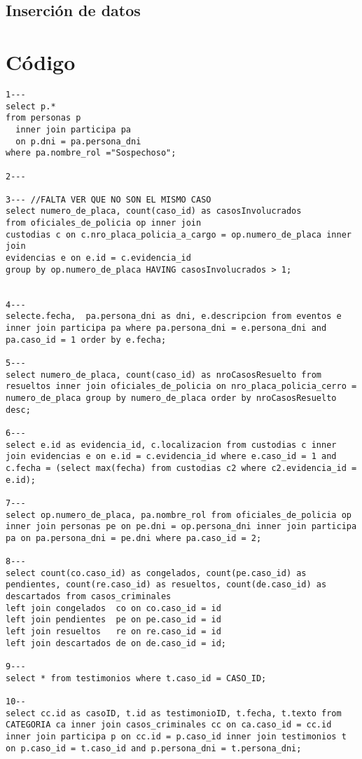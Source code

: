 \documentclass[10pt,a4paper]{article}
\begin{document}
\subsection{Inserción de datos}

\section{Código}
\begin{verbatim}
1---
select p.* 
from personas p 
  inner join participa pa 
  on p.dni = pa.persona_dni 
where pa.nombre_rol ="Sospechoso";

2---

3--- //FALTA VER QUE NO SON EL MISMO CASO
select numero_de_placa, count(caso_id) as casosInvolucrados
from oficiales_de_policia op inner join 
custodias c on c.nro_placa_policia_a_cargo = op.numero_de_placa inner join 
evidencias e on e.id = c.evidencia_id 
group by op.numero_de_placa HAVING casosInvolucrados > 1;


4---
selecte.fecha,  pa.persona_dni as dni, e.descripcion from eventos e inner join participa pa where pa.persona_dni = e.persona_dni and pa.caso_id = 1 order by e.fecha;

5---
select numero_de_placa, count(caso_id) as nroCasosResuelto from resueltos inner join oficiales_de_policia on nro_placa_policia_cerro = numero_de_placa group by numero_de_placa order by nroCasosResuelto desc;

6---
select e.id as evidencia_id, c.localizacion from custodias c inner join evidencias e on e.id = c.evidencia_id where e.caso_id = 1 and c.fecha = (select max(fecha) from custodias c2 where c2.evidencia_id = e.id);

7---
select op.numero_de_placa, pa.nombre_rol from oficiales_de_policia op inner join personas pe on pe.dni = op.persona_dni inner join participa pa on pa.persona_dni = pe.dni where pa.caso_id = 2;

8---
select count(co.caso_id) as congelados, count(pe.caso_id) as pendientes, count(re.caso_id) as resueltos, count(de.caso_id) as descartados from casos_criminales 
left join congelados  co on co.caso_id = id 
left join pendientes  pe on pe.caso_id = id 
left join resueltos   re on re.caso_id = id 
left join descartados de on de.caso_id = id;

9---
select * from testimonios where t.caso_id = CASO_ID;

10--
select cc.id as casoID, t.id as testimonioID, t.fecha, t.texto from CATEGORIA ca inner join casos_criminales cc on ca.caso_id = cc.id inner join participa p on cc.id = p.caso_id inner join testimonios t on p.caso_id = t.caso_id and p.persona_dni = t.persona_dni;
\end{verbatim}
\end{document}
